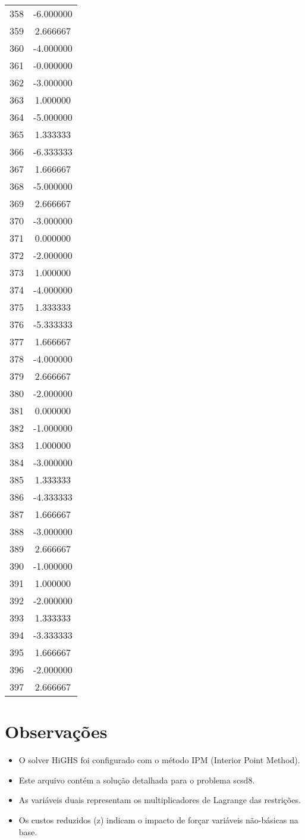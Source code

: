\documentclass[12pt]{article}
\begin{document}
\begin{longtable}{@{}cc@{}}
358 & -6.000000 \\
359 & 2.666667 \\
360 & -4.000000 \\
361 & -0.000000 \\
362 & -3.000000 \\
363 & 1.000000 \\
364 & -5.000000 \\
365 & 1.333333 \\
366 & -6.333333 \\
367 & 1.666667 \\
368 & -5.000000 \\
369 & 2.666667 \\
370 & -3.000000 \\
371 & 0.000000 \\
372 & -2.000000 \\
373 & 1.000000 \\
374 & -4.000000 \\
375 & 1.333333 \\
376 & -5.333333 \\
377 & 1.666667 \\
378 & -4.000000 \\
379 & 2.666667 \\
380 & -2.000000 \\
381 & 0.000000 \\
382 & -1.000000 \\
383 & 1.000000 \\
384 & -3.000000 \\
385 & 1.333333 \\
386 & -4.333333 \\
387 & 1.666667 \\
388 & -3.000000 \\
389 & 2.666667 \\
390 & -1.000000 \\
391 & 1.000000 \\
392 & -2.000000 \\
393 & 1.333333 \\
394 & -3.333333 \\
395 & 1.666667 \\
396 & -2.000000 \\
397 & 2.666667 \\

\end{longtable}


\section{Observações}

\begin{itemize}
\item O solver HiGHS foi configurado com o método IPM (Interior Point Method).
\item Este arquivo contém a solução detalhada para o problema scsd8.
\item As variáveis duais representam os multiplicadores de Lagrange das restrições.
\item Os custos reduzidos (z) indicam o impacto de forçar variáveis não-básicas na base.
\end{itemize}
\end{document}
